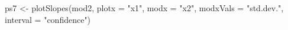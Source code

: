 \begin{Schunk}
\begin{Sinput}
 ps7 <- plotSlopes(mod2, plotx = "x1", modx = "x2", modxVals = "std.dev.", interval = "confidence")
\end{Sinput}
\end{Schunk}
